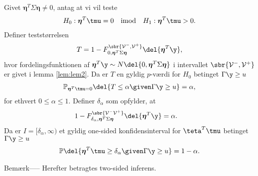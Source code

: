 \begin{lem} \label{lem:lem3}
Givet \(\boldsymbol{\eta}^T \Sigma \boldsymbol{\eta} \neq 0\), antag at vi vil teste
\begin{align*}
H_0: \boldsymbol{\eta}^T \tmu=0 \quad \text{imod} \quad H_1: \boldsymbol{\eta}^T \tmu > 0.
\end{align*}
Definer teststørrelsen
\begin{align}
T=1- F_{0, \boldsymbol{\eta}^T \Sigma \boldsymbol{\eta}}^{\sbr{\mathcal{V}^-, \mathcal{V}^+}} \del{\boldsymbol{\eta}^T \y}, \label{eq:post_1.14}
\end{align}
hvor fordelingsfunktionen af \(\boldsymbol{\eta}^T \y \sim N \del{0,  \boldsymbol{\eta}^T \Sigma \boldsymbol{\eta}}\) i intervallet \(\sbr{\mathcal{V}^-, \mathcal{V}^+}\) er givet i lemma \ref{lem:lem2}.
Da er \(T\) en gyldig \(p\)-værdi for \(H_0\) betinget \(\Gamma \y \geq u\)
\begin{align}
\mathbb{P}_{\boldsymbol{\eta}^T \tmu=0} \del{T \leq \alpha \given \Gamma \y \geq u} = \alpha, \label{eq:post_1.15}
\end{align}
for ethvert \(0 \leq \alpha \leq 1\). 
Definer \(\delta_{\alpha}\) som opfylder, at
\begin{align*}
1-F_{\delta_{\alpha}, \boldsymbol{\eta}^T \Sigma \boldsymbol{\eta}}^{\sbr{\mathcal{V}^- \mathcal{V}^+}} \del{\boldsymbol{\eta}^T \y} &= \alpha.
\end{align*}
Da er \(I= [\delta_\alpha, \infty )\) et gyldig one-sided konfidensinterval for \(\teta^T \tmu\) betinget \(\Gamma \y \geq u\)
\begin{align*}
\mathbb{P} \del{\boldsymbol{\eta}^T \tmu \geq \delta_\alpha \given \Gamma \y \geq u} = 1- \alpha.
\end{align*}
\end{lem}
%
Bemærk-----
Herefter betragtes two-sided inferens.
%
